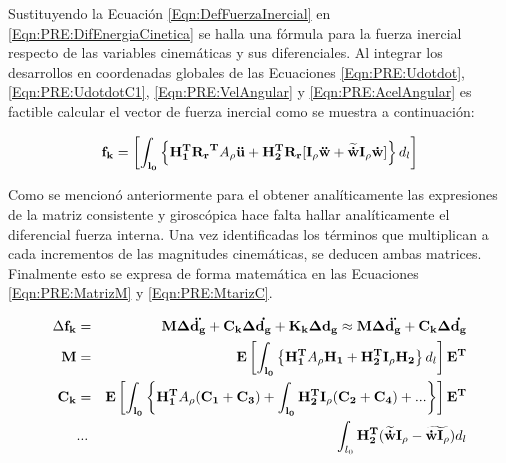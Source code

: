 Sustituyendo la Ecuación \eqref{Eqn:DefFuerzaInercial} en \eqref{Eqn:PRE:DifEnergiaCinetica} se halla una fórmula para la fuerza inercial respecto de las variables cinemáticas y sus diferenciales. Al integrar los desarrollos en coordenadas globales de las Ecuaciones \eqref{Eqn:PRE:Udotdot}, \eqref{Eqn:PRE:UdotdotC1}, \eqref{Eqn:PRE:VelAngular} y \eqref{Eqn:PRE:AcelAngular}  es factible calcular el vector de fuerza inercial como se muestra a continuación:

\begin{equation}\label{Eqn:PRE:FuerzaInercial}
\bf{f}_k=\left [ \int _{l_0} \left \{ \bf{H}_1^T\bf{R_r}^T \text{$A_\rho$}\ddot{\bf{u}} +\bf{H}_2^T \bf{R_r} [\bf{I}_\rho\ddot{\bf{w}}+\widetilde{\dot{\bf{w}}}\bf{I}_\rho\dot{w}] \right \} \text{$d_l$} \right  ]
\end{equation} 
 
Como se mencionó anteriormente para el obtener analíticamente las expresiones de la matriz consistente y giroscópica hace falta hallar analíticamente el diferencial fuerza interna. Una vez identificadas los términos que multiplican a cada incrementos de las magnitudes cinemáticas, se deducen ambas matrices. Finalmente esto se expresa de forma matemática en las Ecuaciones \eqref{Eqn:PRE:MatrizM} y \eqref{Eqn:PRE:MtarizC}.

\begin{eqnarray}
	\Delta \bf{f_k}&= &\bf{M} \Delta \ddot{\bf{d}_g}+\bf{C}_k \Delta \dot{\bf{d}_g}+\bf{K}_k \Delta \bf{d}_g\approx \bf{M} \Delta \ddot{\bf{d}_g}+\bf{C}_k \Delta \dot{\bf{d}_g}\\
	\label{Eqn:PRE:MatrizM}
	\bf{M}&=&\bf{E}\left [ \int _{l_0} \left \{ \bf{H}_1^T \text{$A_\rho$}\bf{H}_1 +\bf{H}_2^T\bf{I}_\rho\bf{H_2} \right \} \text{$d_l$} \right  ]\bf{E}^T\\
	\label{Eqn:PRE:MtarizC}
	\bf{C}_k&=&\bf{E}\left [ \int _{l_0} \left \{ \bf{H}_1^T \text{$A_\rho$}(\bf{C}_1+\bf{C}_3) +\int _{l_0}\bf{H}_2^T\bf{I}_\rho(\bf{C}_2+\bf{C}_4) +...\right \}\right  ]\bf{E}^T\\
	&...& \int_{l_0} \bf{H}_2 ^T(\widetilde{\dot{w}}\bf{I}_\rho-\widetilde{\dot{w}\bf{I}_\rho}) \text{$d_l$} 	
\end{eqnarray}

\newpage  
